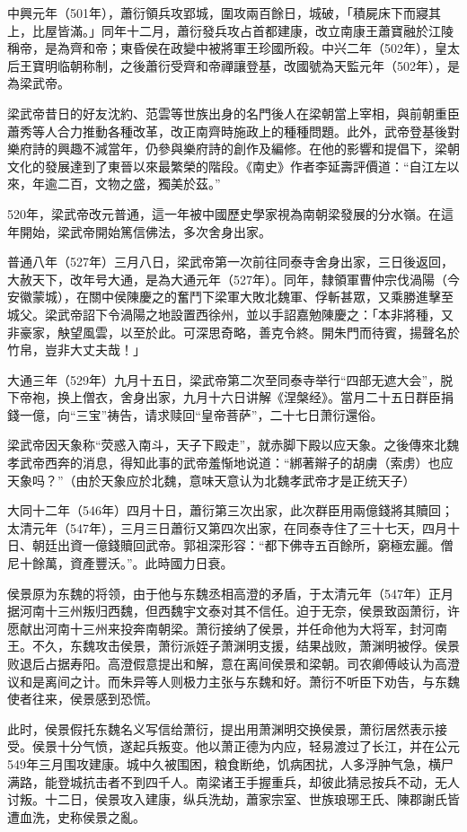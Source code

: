 中興元年（501年），蕭衍領兵攻郢城，圍攻兩百餘日，城破，「積屍床下而寢其上，比屋皆滿。」同年十二月，蕭衍發兵攻占首都建康，改立南康王蕭寶融於江陵稱帝，是為齊和帝；東昏侯在政變中被將軍王珍國所殺。中兴二年（502年），皇太后王寶明临朝称制，之後蕭衍受齊和帝禪讓登基，改國號為天監元年（502年），是為梁武帝。

梁武帝昔日的好友沈約、范雲等世族出身的名門後人在梁朝當上宰相，與前朝重臣蕭秀等人合力推動各種改革，改正南齊時施政上的種種問題。此外，武帝登基後對樂府詩的興趣不減當年，仍參與樂府詩的創作及編修。在他的影響和提倡下，梁朝文化的發展達到了東晉以來最繁榮的階段。《南史》作者李延壽評價道：“自江左以來，年逾二百，文物之盛，獨美於茲。”

520年，梁武帝改元普通，這一年被中國歷史學家視為南朝梁發展的分水嶺。在這年開始，梁武帝開始篤信佛法，多次舍身出家。

普通八年（527年）三月八日，梁武帝第一次前往同泰寺舍身出家，三日後返回，大赦天下，改年号大通，是為大通元年（527年）。同年，隸領軍曹仲宗伐渦陽（今安徽蒙城），在關中侯陳慶之的奮鬥下梁軍大敗北魏軍、俘斬甚眾，又乘勝進擊至城父。梁武帝詔下令渦陽之地設置西徐州，並以手詔嘉勉陳慶之：「本非將種，又非豪家，觖望風雲，以至於此。可深思奇略，善克令終。開朱門而待賓，揚聲名於竹帛，豈非大丈夫哉！」

大通三年（529年）九月十五日，梁武帝第二次至同泰寺举行“四部无遮大会”，脱下帝袍，换上僧衣，舍身出家，九月十六日讲解《涅槃经》。當月二十五日群臣捐錢一億，向“三宝”祷告，请求赎回“皇帝菩萨”，二十七日萧衍還俗。

梁武帝因天象称“荧惑入南斗，天子下殿走”，就赤脚下殿以应天象。之後傳來北魏孝武帝西奔的消息，得知此事的武帝羞惭地说道：“綁著辮子的胡虜（索虏）也应天象吗？”（由於天象应於北魏，意味天意认为北魏孝武帝才是正统天子）

大同十二年（546年）四月十日，蕭衍第三次出家，此次群臣用兩億錢將其贖回；太清元年（547年），三月三日蕭衍又第四次出家，在同泰寺住了三十七天，四月十日、朝廷出資一億錢贖回武帝。郭祖深形容：“都下佛寺五百餘所，窮極宏麗。僧尼十餘萬，資產豐沃。”。此時國力日衰。

侯景原为东魏的将领，由于他与东魏丞相高澄的矛盾，于太清元年（547年）正月据河南十三州叛归西魏，但西魏宇文泰对其不信任。迫于无奈，侯景致函萧衍，许愿献出河南十三州来投奔南朝梁。萧衍接纳了侯景，并任命他为大将军，封河南王。不久，东魏攻击侯景，萧衍派姪子萧渊明支援，结果战败，萧渊明被俘。侯景败退后占据寿阳。高澄假意提出和解，意在离间侯景和梁朝。司农卿傅岐认为高澄议和是离间之计。而朱异等人则极力主张与东魏和好。萧衍不听臣下劝告，与东魏使者往来，侯景感到恐慌。

此时，侯景假托东魏名义写信给萧衍，提出用萧渊明交换侯景，萧衍居然表示接受。侯景十分气愤，遂起兵叛变。他以萧正德为内应，轻易渡过了长江，并在公元549年三月围攻建康。城中久被围困，粮食断绝，饥病困扰，人多浮肿气急，横尸满路，能登城抗击者不到四千人。南梁诸王手握重兵，却彼此猜忌按兵不动，无人讨叛。十二日，侯景攻入建康，纵兵洗劫，蕭家宗室、世族琅琊王氏、陳郡謝氏皆遭血洗，史称侯景之亂。

